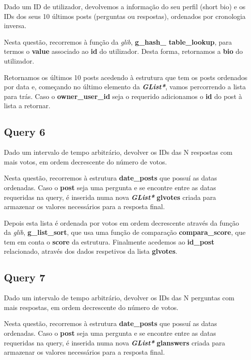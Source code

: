 \documentclass[a4paper]{article}
\begin{document}
Dado um ID de utilizador, devolvemos a informação do seu perfil (short 
bio) e os IDs dos seus 10 últimos posts (perguntas ou respostas), 
ordenados por cronologia inversa.

Nesta questão, recorremos à função da \textit{glib}, \textbf{g\_hash\_
table\_lookup}, para termos o \textbf{value} associado ao \textbf{id}
do utilizador. Desta forma, retornamos a \textbf{bio} do utilizador.

Retornamos os últimos 10 posts acedendo à estrutura que tem os posts
ordenados por data e, começando no último elemento da \textit{
\textbf{GList*}}, vamos percorrendo a lista para trás. Caso o \textbf{
owner\_user\_id} seja o requerido adicionamos o \textbf{id} do post à 
lista a retornar.

\subsection{Query 6}

Dado um intervalo de tempo arbitrário, devolver os IDs das N respostas 
com mais votos, em ordem decrescente do número de votos.

Nesta questão, recorremos à estrutura \textbf{date\_posts} que possuí 
as datas ordenadas. Caso o \textbf{post} seja uma pergunta e
se encontre entre as datas requeridas na query, é inserida numa nova
\textit{\textbf{GList*}} \textbf{glvotes} criada para armazenar os 
valores necessários para a resposta final.

Depois esta lista é ordenada por votos em ordem decrescente através da 
função da \textit{glib}, \textbf{g\_list\_sort}, que usa uma função de 
comparação \textbf{compara\_score}, que tem em conta o \textbf{score}
da estrutura. Finalmente acedemos ao \textbf{id\_post} relacionado, 
através dos dados respetivos da lista \textbf{glvotes}.

\subsection{Query 7}

Dado um intervalo de tempo arbitrário, devolver os IDs das N perguntas 
com mais respostas, em ordem decrescente do número de votos.

Nesta questão, recorremos à estrutura \textbf{date\_posts} que possuí 
as datas ordenadas. Caso o \textbf{post} seja uma pergunta e
se encontre entre as datas requeridas na query, é inserida numa nova
\textit{\textbf{GList*}} \textbf{glanswers} criada para armazenar os 
valores necessários para a resposta final.
\end{document}
